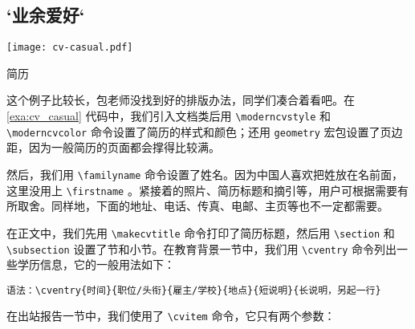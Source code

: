 \begin{Code}[numbers=left, firstnumber=last]
\section{`业余爱好`}

\end{Code}

\begin{example}[!h]
\begin{Demo}
\centering
\texttt{[image: cv-casual.pdf]}
\end{Demo}
\end{example}

\begin{example}[!h]
\begin{Demo}
\centering
{}
\end{Demo}
\caption{简历}
\label{exa:cv_casual}
\end{example}

这个例子比较长，包老师没找到好的排版办法，同学们凑合着看吧。在 \autoref{exa:cv_casual} 代码中，我们引入文档类后用 \verb|\moderncvstyle| 和 \verb|\moderncvcolor| 命令设置了简历的样式和颜色；还用 \texttt{geometry} 宏包设置了页边距，因为一般简历的页面都会撑得比较满。

然后，我们用 \verb|\familyname| 命令设置了姓名。因为中国人喜欢把姓放在名前面，这里没用上 \verb|\firstname| 。紧接着的照片、简历标题和摘引等，用户可根据需要有所取舍。同样地，下面的地址、电话、传真、电邮、主页等也不一定都需要。

在正文中，我们先用 \verb|\makecvtitle| 命令打印了简历标题，然后用 \verb|\section| 和 \verb|\subsection| 设置了节和小节。在教育背景一节中，我们用 \verb|\cventry| 命令列出一些学历信息，它的一般用法如下：

\verb|语法：\cventry{时间}{职位/头衔}{雇主/学校}{地点}{短说明}{长说明，另起一行}|

在出站报告一节中，我们使用了 \verb|\cvitem| 命令，它只有两个参数：

